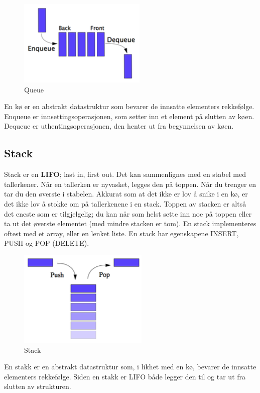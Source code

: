 \begin{figure}[H]
\includegraphics[scale=0.7]{images/ko}
\centering %
\caption{Queue}
\label{fig:ko}
\end{figure}

\noindent En kø er en abstrakt datastruktur som bevarer de innsatte elementers rekkefølge. Enqueue er innsettingsoperasjonen, som setter inn et element på slutten av køen. Dequeue er uthentingsoperasjonen, den henter ut fra begynnelsen av køen.

\subsection{Stack}
Stack er en \textbf{LIFO}; last in, first out. Det kan sammenlignes med en stabel med tallerkener. Når en tallerken er nyvasket, legges den på toppen. Når du trenger en tar du den øverste i stabelen. Akkurat som at det ikke er lov å snike i en kø, er det ikke lov å stokke om på tallerkenene i en stack. Toppen av stacken er altså det eneste som er tilgjelgelig; du kan når som helst sette inn noe på toppen eller ta ut det øverste elementet (med mindre stacken er tom). En stack implementeres oftest med et array, eller en lenket liste. En stack har egenskapene INSERT, PUSH og POP (DELETE).

\begin{figure}[H]
\includegraphics[scale=0.7]{images/stack}
\centering %
\caption{Stack}
\label{fig:stack}
\end{figure}

\noindent En stakk er en abstrakt datastruktur som, i likhet med en kø, bevarer de innsatte elementers rekkefølge. Siden en stakk er LIFO både legger den til og tar ut fra slutten av strukturen.

